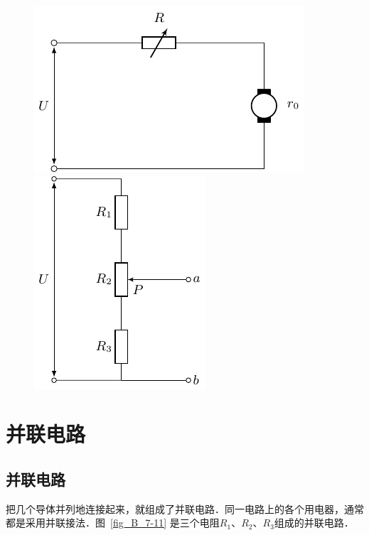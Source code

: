 \begin{figure}[htbp]
    \centering
    \begin{minipage}[t]{0.48\textwidth}
        \centering
        \includegraphics{fig/B/7-9.pdf}
        \caption{}\label{fig_B_7-9}
    \end{minipage}
    \begin{minipage}[t]{0.48\textwidth}
        \centering
        \includegraphics{fig/B/7-10.pdf}
        \caption{}\label{fig_B_7-10}
    \end{minipage}
\end{figure}

\section{并联电路}

\subsection{并联电路}


把几个导体并列地连接起来，就组成了并联电路．同一电路上的各个用电器，通常都是采用并联接法．图~\ref{fig_B_7-11} 是三个电阻$R_1$、$R_2$、$R_3$组成的并联电路．

